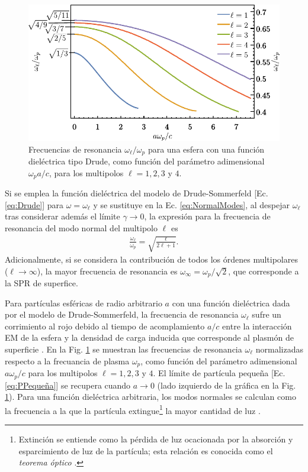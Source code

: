 	\begin{figure}[h!]\centering
		\includegraphics[scale=1]{1-Teoria/figs/1-4-DrudeMultipoles.pdf}\vspace*{-1em}
	\caption{Frecuencias de resonancia $\omega_\ell/\omega_p$ para una esfera con una función dieléctrica tipo Drude, como función del parámetro adimensional  $\omega_p a / c$, para los multipolos $\ell = 1,2,3$ y $4$. }
	\label{fig:NormalModes}
	\end{figure}			
	
Si se emplea la función dieléctrica del modelo de Drude-Sommerfeld [Ec.  \eqref{eq:Drude}] para $\omega = \omega_\ell$	y se sustituye en la Ec.  \eqref{eq:NormalModes}, al despejar $\omega_\ell$ tras considerar además el límite $\gamma\to 0$, la expresión para la frecuencia de resonancia del  modo normal del multipolo $\ell$ es \cite{maciel2017momentum}
	\begin{align}
	\frac{\omega_\ell}{\omega_p} = \sqrt{ \frac{\ell}{2\ell+1}}. \label{eq:PPequeña}
	\end{align}
Adicionalmente, si se considera la contribución de todos los órdenes multipolares ($\ell\to \infty$), la mayor frecuencia de resonancia es $\omega_\infty = \omega_p/\sqrt{2}$, que corresponde a la SPR de superfice.	
	
Para partículas esféricas de radio arbitrario $a$ con una función dieléctrica dada por el modelo de Drude-Sommerfeld, la frecuencia de resonancia $\omega_\ell$ sufre un corrimiento al rojo debido al tiempo de acomplamiento $a/c$ entre la interacción EM de la esfera y  la densidad de carga inducida que corresponde al plasmón de superficie \cite{aizpurua1998coupling}.  En la Fig.  \ref{fig:NormalModes} se muestran las frecuencias de resonancia $\omega_\ell$ normalizadas respecto a la frecuancia de plasma $\omega_p$, como función del parámetro adimensional $a\omega_p / c$ para los multipolos $\ell = 1,2,3$ y $4$.  El límite de partícula pequeña [Ec.  \eqref{eq:PPequeña}]	se recupera cuando  $a\to 0$ (lado izquierdo de la gráfica en la Fig.  \ref{fig:NormalModes}).  Para una función dieléctrica arbitraria, los modos normales se calculan como la frecuencia a la que la partícula extingue\footnote{Extinción se entiende como la pérdida de luz ocacionada por la absorción y esparcimiento de luz de la partícula; esta relación es conocida como el  \emph{teorema óptico} \cite{bohren1998absorption}. } la mayor cantidad de luz \cite{kreibig1995clusters}. 


